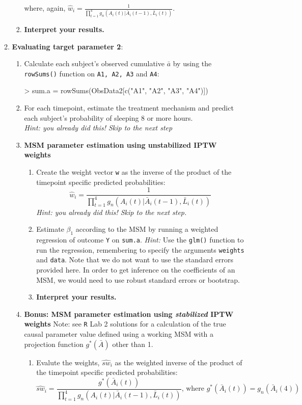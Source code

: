 \documentclass{exam}
\begin{document}
\begin{enumerate}
\begin{enumerate}
\begin{enumerate}
where, again, $\hat{w}_i = \frac{1}{\prod_{t=1}^4g_n(A_i(t)|\bar{A}_i(t-1), \bar{L}_i(t))}$. 
\item \textbf{Interpret your results.}
\end{enumerate}
\item \textbf{Evaluating target parameter 2}:
\begin{enumerate}
\item Calculate each subject's observed cumulative $\bar{a}$ by using the \texttt{rowSums()} function on \texttt{A1, A2, A3} and \texttt{A4}:
\begin{Schunk}
\begin{Sinput}
> sum.a = rowSums(ObsData2[c("A1", "A2", "A3", "A4")])
\end{Sinput}
\end{Schunk}
\item For each timepoint, estimate the treatment mechanism and predict each subject's probability of sleeping 8 or more hours.\\
\textit{Hint: you already did this! Skip to the next step}
\item \textbf{MSM parameter estimation using unstabilized IPTW weights}
\begin{enumerate}
\item Create the weight vector \texttt{w} as the inverse of the product of the timepoint specific predicted probabilities:
\[
\hat{w}_i = \frac{1}{\prod_{t=1}^4g_n(A_i(t)|\bar{A}_i(t-1), \bar{L}_i(t))} 
\]
\textit{Hint: you already did this! Skip to the next step.}
\item Estimate $\beta_1$ according to the MSM by running a weighted regression of outcome \texttt{Y} on \texttt{sum.a}.
\textit{Hint:} Use the \texttt{glm()} function to run the regression, remembering to specify the arguments \texttt{weights} and \texttt{data}. Note that we do not want to use the standard errors provided here. In order to get inference on the coefficients of an MSM, we would need to use robust standard errors or bootstrap.
\item \textbf{Interpret your results.}
\end{enumerate}
\item \textbf{Bonus: MSM parameter estimation using \textit{stabilized} IPTW weights} Note: see \texttt{R} Lab 2 solutions for a calculation of the true causal parameter value defined using a working MSM with a projection function $g^*(\bar{A})$ other than 1.
\begin{enumerate}
\item Evalute the weights, $\hat{sw}_i$ as the weighted inverse of the product of the timepoint specific predicted probabilities:
\[
\hat{sw}_i = \frac{g^*(\bar{A}_i(t))}{\prod_{t=1}^4g_n(A_i(t)|\bar{A}_i(t-1), \bar{L}_i(t))} \text{, where } g^*(\bar{A}_i(t)) = g_n(\bar{A}_i(4))
\]


\end{enumerate}
\end{enumerate}
\end{enumerate}
\end{enumerate}
\end{document}
